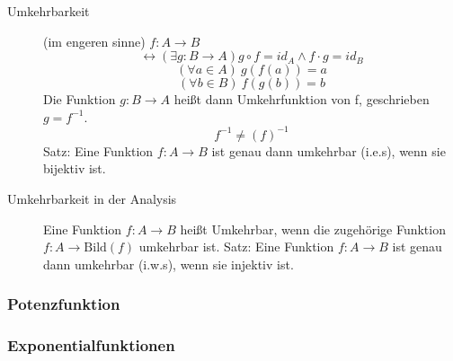 \begin{description}
    \item[Umkehrbarkeit] (im engeren sinne) $f : A \longrightarrow B$
    $$\leftrightarrow (\exists g : B \longrightarrow A) g \circ f = id_A \wedge f \cdot g = id_B$$
    $$(\forall a \in A)\ g(f(a)) = a$$
    $$(\forall b \in B)\ f(g(b)) = b$$
    Die Funktion $g : B \longrightarrow A$ heißt dann Umkehrfunktion von f, geschrieben $g = f^{-1}$.
    $$f^{-1} \not = (f)^{-1}$$
    Satz: Eine Funktion $f : A \longrightarrow B$ ist genau dann umkehrbar (i.e.s), wenn sie bijektiv ist.
    \item[Umkehrbarkeit in der Analysis] Eine Funktion $f : A \longrightarrow B$ heißt Umkehrbar, wenn die zugehörige Funktion $f : A \longrightarrow \textrm{Bild}(f)$ umkehrbar ist.
    Satz: Eine Funktion $f : A \longrightarrow B$ ist genau dann umkehrbar (i.w.s), wenn sie injektiv ist.
\end{description}

\subsubsection{Potenzfunktion}


\subsubsection{Exponentialfunktionen}

